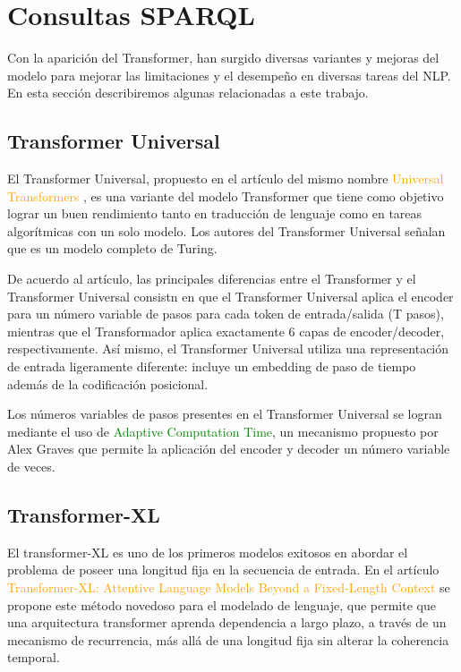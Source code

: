 \documentclass[conference]{IEEEtran}
\begin{document}
\section{Consultas SPARQL}
Con la aparici\'on del Transformer, han surgido diversas variantes y mejoras del modelo para  mejorar las limitaciones  y el desempe\~no en diversas tareas del NLP. En esta secci\'on describiremos algunas relacionadas a este trabajo.

\subsection{Transformer Universal}

El Transformer Universal, propuesto en el art\'iculo del mismo nombre \textcolor{orange}{Universal Transformers} \cite{b5}, es una variante del modelo Transformer que tiene como objetivo lograr un buen rendimiento tanto en traducci\'on de lenguaje como en tareas algor\'itmicas con un solo modelo. Los autores del Transformer Universal se\~nalan que es un modelo completo de Turing. 

\vspace{0.2cm}

De acuerdo al art\'iculo, las principales diferencias entre el Transformer y el Transformer Universal consistn en que el Transformer Universal aplica el encoder para un n\'umero variable de pasos para cada token de entrada/salida (T pasos), mientras que el Transformador aplica exactamente $6$ capas de encoder/decoder, respectivamente. As\'i mismo, el Transformer Universal utiliza una representaci\'on de entrada ligeramente diferente: incluye un embedding de paso de tiempo adem\'as de la codificaci\'on posicional.

\vspace{0.2cm}

Los n\'umeros variables de pasos presentes en el Transformer Universal se logran mediante el uso de \textcolor{green}{Adaptive Computation Time}, un mecanismo propuesto por Alex Graves \cite{b6} que permite la aplicaci\'on del encoder y decoder un n\'umero variable de veces.
	
\vspace{0.2cm}

\subsection{Transformer-XL}

El transformer-XL es uno de los primeros modelos exitosos en abordar el problema de poseer una longitud fija en la secuencia de entrada. En el art\'iculo \textcolor{orange}{Transformer-XL: Attentive Language Models Beyond a Fixed-Length Context} \cite{b7} se propone este m\'etodo novedoso para el modelado de lenguaje, que permite que una arquitectura transformer aprenda dependencia a largo plazo, a trav\'es de un mecanismo de recurrencia, m\'as all\'a de una longitud fija sin alterar la coherencia temporal.
\end{document}
